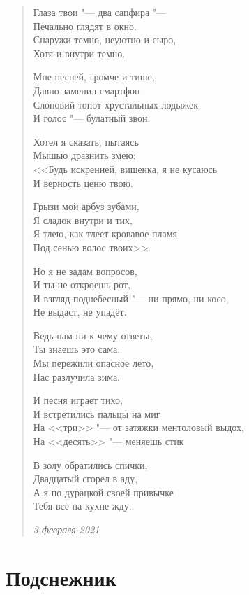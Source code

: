 \documentclass[a4paper,12pt]{article}
\newcommand{\ldotst}{\so{...}\xspace}
\begin{document}
\begin{verse}
Глаза твои "--- два сапфира "--- \\
Печально глядят в окно. \\
Снаружи темно, неуютно и сыро, \\
Хотя и внутри темно.

Мне песней, громче и тише, \\
Давно заменил смартфон \\
Слоновий топот хрустальных лодыжек \\
И голос "--- булатный звон.

Хотел я сказать, пытаясь \\
Мышью дразнить змею: \\
<<Будь искренней, вишенка, я не кусаюсь \\
И верность ценю твою.

Грызи мой арбуз зубами, \\
Я сладок внутри и тих, \\
Я тлею, как тлеет кровавое пламя \\
Под сенью волос твоих>>.

Но я не задам вопросов, \\
И ты не откроешь рот, \\
И взгляд поднебесный "--- ни прямо, ни косо, \\
Не выдаст, не упадёт.

Ведь нам ни к чему ответы, \\
Ты знаешь это сама: \\
Мы пережили опасное лето, \\
Нас разлучила зима.

И песня играет тихо, \\
И встретились пальцы на миг\ldotst \\
На <<три>> "--- от затяжки ментоловый выдох, \\
На <<десять>> "--- меняешь стик\ldotst

В золу обратились спички, \\
Двадцатый сгорел в аду, \\
А я по дурацкой своей привычке \\
Тебя всё на кухне жду.

\emph{3 февраля 2021}
\end{verse}

\section{Подснежник}
\end{document}

